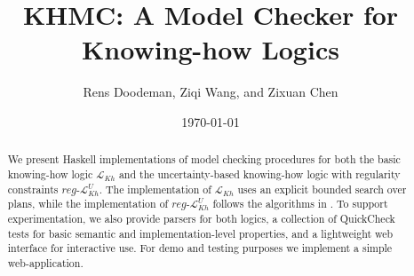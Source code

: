 \documentclass[12pt,a4paper]{article}
\title{KHMC: A Model Checker for Knowing-how Logics}
\author{Rens Doodeman, Ziqi Wang, and Zixuan Chen}
\date{\today}
\begin{document}
\maketitle

\begin{abstract}
We present Haskell implementations of model checking procedures for both the basic knowing-how logic $\mathcal{L}_{Kh}$ and the uncertainty-based knowing-how logic with regularity constraints $reg\text{-}\mathcal{L}^U_{Kh}$. The implementation of $\mathcal{L}_{Kh}$ uses an explicit bounded search over plans, while the implementation of $reg\text{-}\mathcal{L}^U_{Kh}$ follows the algorithms in \cite{Demri2023}. To support experimentation, we also provide parsers for both logics, a collection of QuickCheck tests for basic semantic and implementation-level properties, and a lightweight web interface for interactive use. For demo and testing purposes we implement a simple web-application.
\end{abstract}

\vspace{2cm} 
\tableofcontents

\clearpage


%



% 







% 







\end{document}
